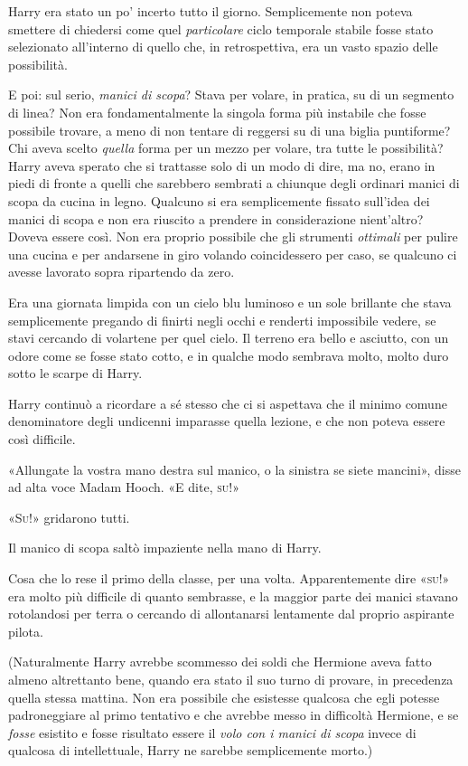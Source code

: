 Harry era stato un po’ incerto tutto il giorno. Semplicemente non poteva smettere di chiedersi come quel \textit{particolare} ciclo temporale stabile fosse stato selezionato all’interno di quello che, in retrospettiva, era un vasto spazio delle possibilità.

E poi: sul serio, \textit{manici di scopa}? Stava per volare, in pratica, su di un segmento di linea? Non era fondamentalmente la singola forma più instabile che fosse possibile trovare, a meno di non tentare di reggersi su di una biglia puntiforme? Chi aveva scelto \textit{quella} forma per un mezzo per volare, tra tutte le possibilità? Harry aveva sperato che si trattasse solo di un modo di dire, ma no, erano in piedi di fronte a quelli che sarebbero sembrati a chiunque degli ordinari manici di scopa da cucina in legno. Qualcuno si era semplicemente fissato sull’idea dei manici di scopa e non era riuscito a prendere in considerazione nient’altro? Doveva essere così. Non era proprio possibile che gli strumenti \textit{ottimali} per pulire una cucina e per andarsene in giro volando coincidessero per caso, se qualcuno ci avesse lavorato sopra ripartendo da zero.

Era una giornata limpida con un cielo blu luminoso e un sole brillante che stava semplicemente pregando di finirti negli occhi e renderti impossibile vedere, se stavi cercando di volartene per quel cielo. Il terreno era bello e asciutto, con un odore come se fosse stato cotto, e in qualche modo sembrava molto, molto duro sotto le scarpe di Harry.

Harry continuò a ricordare a sé stesso che ci si aspettava che il minimo comune denominatore degli undicenni imparasse quella lezione, e che non poteva essere così difficile.

«Allungate la vostra mano destra sul manico, o la sinistra se siete mancini», disse ad alta voce Madam Hooch. «E dite, \textsc{su!}»

«\textsc{Su!}» gridarono tutti.

Il manico di scopa saltò impaziente nella mano di Harry.

Cosa che lo rese il primo della classe, per una volta. Apparentemente dire «\textsc{su!}» era molto più difficile di quanto sembrasse, e la maggior parte dei manici stavano rotolandosi per terra o cercando di allontanarsi lentamente dal proprio aspirante pilota.

(Naturalmente Harry avrebbe scommesso dei soldi che Hermione aveva fatto almeno altrettanto bene, quando era stato il suo turno di provare, in precedenza quella stessa mattina. Non era possibile che esistesse qualcosa che egli potesse padroneggiare al primo tentativo e che avrebbe messo in difficoltà Hermione, e se \textit{fosse} esistito e fosse risultato essere il \textit{volo con i manici di scopa} invece di qualcosa di intellettuale, Harry ne sarebbe semplicemente morto.)

